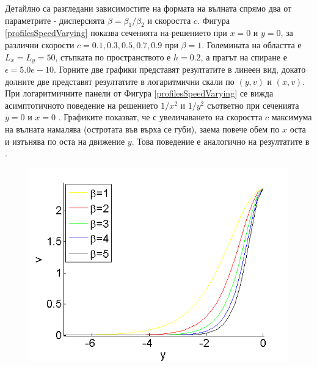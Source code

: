 \documentclass[a4paper]{article}
\theoremstyle{remark}
\begin{document}
\begin{large}
Детайлно са разгледани зависимостите на формата на вълната спрямо два от параметрите - дисперсията $\beta=\beta_1 / \beta_2$ и скоростта $c$.
Фигура \ref{profilesSpeedVarying} показва сеченията на решението при $x=0$ и $y=0$, за различни скорости $c=0.1, 0.3, 0.5, 0.7, 0.9$ при $\beta = 1$. Големината на областта е $L_x = L_y = 50$, стъпката по пространството е $h = 0.2$, а прагът на спиране е $\epsilon = 5.0e-10$. Горните две графики представят резултатите в линеен вид, докато долните две представят резултатите в логаритмични скали по $(y,v)$ и $(x,v)$. При логаритмичните панели от Фигура \ref{profilesSpeedVarying} се вижда асимптотичното поведение на решението $1/x^2$ и $1/y^2$ съответно при сеченията $y=0$ и $x=0$ \cite{ref15, ref117, ref116}. Графиките показват, че с увеличаването на скоростта $c$ максимума на вълната намалява (остротата във върха се губи), заема повече обем по $x$ оста и изтънява по оста на движение $y$. Това поведение е аналогично на резултатите в \cite{ref15, ref117, ref116}.
\begin{figure}[ht]
	\begin{minipage}[b]{0.5\linewidth}
		\raggedleft
		\includegraphics[width=\linewidth]{SolutionProfiles/ChristovIVX=0_ZB2_bt1_5_c017_h020_O(h^6).png}
	\end{minipage}	
	\begin{minipage}[b]{0.5\linewidth}
		\raggedright

\end{minipage}
\end{figure}
\end{large}
\end{document}
